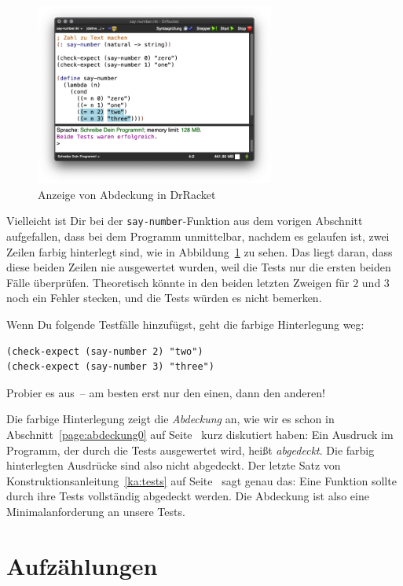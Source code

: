 \begin{figure}[tb]
  \centering
  \includegraphics[width=0.7\textwidth]{fallunterscheidungen/coverage}
  \caption{Anzeige von Abdeckung in DrRacket}
  \label{fig:coverage}
\end{figure}

Vielleicht ist Dir bei der \lstinline{say-number}-Funktion aus dem
vorigen Abschnitt aufgefallen, dass bei dem Programm unmittelbar, nachdem
es gelaufen ist, zwei Zeilen farbig
hinterlegt sind, wie in Abbildung~\ref{fig:coverage} zu sehen.  Das liegt
daran, dass diese beiden Zeilen nie ausgewertet wurden, weil die
Tests nur die ersten beiden Fälle überprüfen.  Theoretisch
könnte in den beiden letzten Zweigen für $2$ und $3$ noch ein Fehler
stecken, und die Tests würden es nicht bemerken.

Wenn Du folgende Testfälle hinzufügst, geht die farbige Hinterlegung weg:
%
\begin{lstlisting}
(check-expect (say-number 2) "two")
(check-expect (say-number 3) "three")
\end{lstlisting}
%
Probier es aus~-- am besten erst nur den einen, dann den anderen!

Die farbige Hinterlegung zeigt die \textit{Abdeckung} an, wie wir es
schon in Abschnitt~\ref{page:abdeckung0} auf
Seite~\pageref{page:abdeckung0} kurz diskutiert haben: Ein Ausdruck im
Programm, der durch die Tests ausgewertet wird, heißt
\textit{abgedeckt}.  Die farbig hinterlegten Ausdrücke sind also nicht
abgedeckt.  Der letzte Satz von Konstruktionsanleitung~\ref{ka:tests}
auf Seite~\pageref{ka:tests} sagt genau das: Eine Funktion sollte
durch ihre Tests vollständig abgedeckt werden.  Die Abdeckung ist also
eine Minimalanforderung an unsere Tests.

\section{Aufzählungen}

